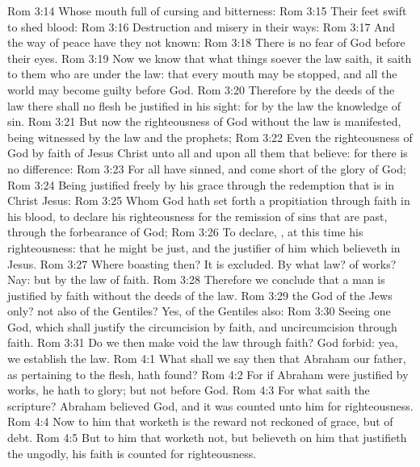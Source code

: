 \vs Rom 3:14 Whose mouth  full of cursing and bitterness:
\vs Rom 3:15 Their feet  swift to shed blood:
\vs Rom 3:16 Destruction and misery  in their ways:
\vs Rom 3:17 And the way of peace have they not known:
\vs Rom 3:18 There is no fear of God before their eyes.
\vs Rom 3:19 Now we know that what things soever the law saith, it saith to them who are under the law: that every mouth may be stopped, and all the world may become guilty before God.
\vs Rom 3:20 Therefore by the deeds of the law there shall no flesh be justified in his sight: for by the law  the knowledge of sin.
\vs Rom 3:21 But now the righteousness of God without the law is manifested, being witnessed by the law and the prophets;
\vs Rom 3:22 Even the righteousness of God  by faith of Jesus Christ unto all and upon all them that believe: for there is no difference:
\vs Rom 3:23 For all have sinned, and come short of the glory of God;
\vs Rom 3:24 Being justified freely by his grace through the redemption that is in Christ Jesus:
\vs Rom 3:25 Whom God hath set forth  a propitiation through faith in his blood, to declare his righteousness for the remission of sins that are past, through the forbearance of God;
\vs Rom 3:26 To declare, , at this time his righteousness: that he might be just, and the justifier of him which believeth in Jesus.
\vs Rom 3:27 Where  boasting then? It is excluded. By what law? of works? Nay: but by the law of faith.
\vs Rom 3:28 Therefore we conclude that a man is justified by faith without the deeds of the law.
\vs Rom 3:29  the God of the Jews only?  not also of the Gentiles? Yes, of the Gentiles also:
\vs Rom 3:30 Seeing  one God, which shall justify the circumcision by faith, and uncircumcision through faith.
\vs Rom 3:31 Do we then make void the law through faith? God forbid: yea, we establish the law.
\vs Rom 4:1 What shall we say then that Abraham our father, as pertaining to the flesh, hath found?
\vs Rom 4:2 For if Abraham were justified by works, he hath  to glory; but not before God.
\vs Rom 4:3 For what saith the scripture? Abraham believed God, and it was counted unto him for righteousness.
\vs Rom 4:4 Now to him that worketh is the reward not reckoned of grace, but of debt.
\vs Rom 4:5 But to him that worketh not, but believeth on him that justifieth the ungodly, his faith is counted for righteousness.

